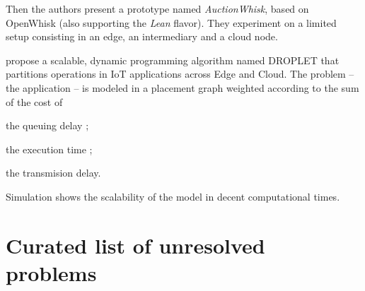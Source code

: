 \documentclass[11pt]{sdm}
\begin{document}
\begin{description}
	Then the authors present a prototype named \emph{AuctionWhisk}, based on OpenWhisk (also supporting the \emph{Lean} flavor). They experiment on a limited setup consisting in an edge, an intermediary and a cloud node.
	
	\item[\citet{elgamal_droplet_2018}] propose a scalable, dynamic programming algorithm named DROPLET that partitions operations in \gls{IoT} applications across Edge and Cloud. The problem -- the application -- is modeled in a placement graph weighted according to the sum of the cost of
	\begin{enumerate*}[(i)]
		\item the queuing delay ;
		\item the execution time ;
		\item the transmision delay.
	\end{enumerate*}
	Simulation shows the scalability of the model in decent computational times.

\end{description}










\section{Curated list of unresolved problems}
\end{document}
